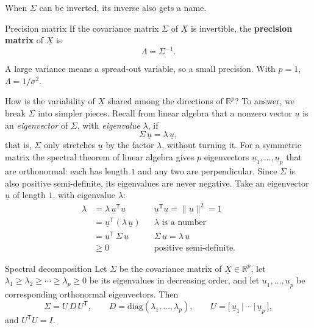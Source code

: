 \documentclass[a4paper,12pt,oneside]{report}
\begin{document}
When $\Sigma$ can be inverted, its inverse also gets a name.

\begin{frameddefn}{Precision matrix}\label{def:precision}
If the covariance matrix $\Sigma$ of $\underline{X}$ is invertible, the
\textbf{precision matrix} of $\underline{X}$ is
\[
\Lambda=\Sigma^{-1}.
\]
\end{frameddefn}

A large variance means a spread-out variable, so a small precision. With
$p=1$, $\Lambda=1/\sigma^2$.

How is the variability of $\underline{X}$ shared among the directions of
$\mathbb{R}^p$? To answer, we break $\Sigma$ into simpler pieces. Recall
from linear algebra that a nonzero vector $\underline{u}$ is an
\emph{eigenvector} of $\Sigma$, with \emph{eigenvalue} $\lambda$, if
\[
\Sigma\,\underline{u}=\lambda\,\underline{u},
\]
that is, $\Sigma$ only stretches $\underline{u}$ by the factor $\lambda$,
without turning it. For a symmetric matrix the spectral theorem of linear
algebra gives $p$ eigenvectors $\underline{u}_1,\ldots,\underline{u}_p$
that are orthonormal: each has length $1$ and any two are perpendicular.
Since $\Sigma$ is also positive semi-definite, its eigenvalues are never
negative. Take an eigenvector $\underline{u}$ of length $1$, with
eigenvalue $\lambda$:
\begin{align*}
\lambda
&=\lambda\,\underline{u}^{\mathsf T}\underline{u}
&&\text{$\underline{u}^{\mathsf T}\underline{u}=\|\underline{u}\|^2=1$}\\
&=\underline{u}^{\mathsf T}(\lambda\,\underline{u})
&&\text{$\lambda$ is a number}\\
&=\underline{u}^{\mathsf T}\,\Sigma\,\underline{u}
&&\text{$\Sigma\,\underline{u}=\lambda\,\underline{u}$}\\
&\geq0
&&\text{positive semi-definite.}
\end{align*}

\begin{framedprop}{Spectral decomposition}\label{prop:spectral}
Let $\Sigma$ be the covariance matrix of $\underline{X}\in\mathbb{R}^p$,
let $\lambda_1\geq\lambda_2\geq\cdots\geq\lambda_p\geq0$ be its eigenvalues
in decreasing order, and let $\underline{u}_1,\ldots,\underline{u}_p$ be
corresponding orthonormal eigenvectors. Then
\[
\Sigma=U\,D\,U^{\mathsf T},
\qquad
D=\mathrm{diag}(\lambda_1,\ldots,\lambda_p),
\qquad
U=\big[\,\underline{u}_1\,|\,\cdots\,|\,\underline{u}_p\,\big],
\]
and $U^{\mathsf T}U=I$.
\end{framedprop}
\end{document}
